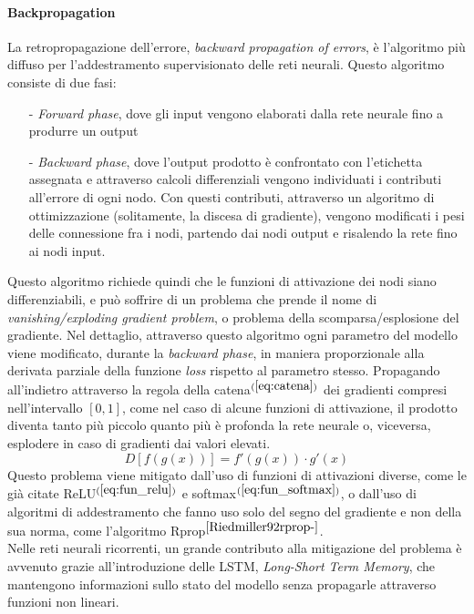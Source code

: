 \paragraph{Backpropagation} La retropropagazione dell'errore, \textit{backward propagation of errors}, è l'algoritmo più diffuso per l'addestramento supervisionato delle reti neurali. Questo algoritmo consiste di due fasi:
\begin{itemize}
    \item[-] \textit{Forward phase}, dove gli input vengono elaborati dalla rete neurale fino a produrre un output
    \item[-] \textit{Backward phase}, dove l'output prodotto è confrontato con l'etichetta assegnata e attraverso calcoli differenziali vengono individuati i contributi all'errore di ogni nodo. Con questi contributi, attraverso un algoritmo di ottimizzazione (solitamente, la discesa di gradiente), vengono modificati i pesi delle connessione fra i nodi, partendo dai nodi output e risalendo la rete fino ai nodi input.
\end{itemize}
Questo algoritmo richiede quindi che le funzioni di attivazione dei nodi siano differenziabili, e può soffrire di un problema che prende il nome di \textit{vanishing/exploding gradient problem}, o problema della scomparsa/esplosione del gradiente. Nel dettaglio, attraverso questo algoritmo ogni parametro del modello viene modificato, durante la \textit{backward phase}, in maniera proporzionale alla derivata parziale della funzione \textit{loss} rispetto al parametro stesso. Propagando all'indietro attraverso la regola della catena$^{(\ref{eq:catena})}$ dei gradienti compresi nell'intervallo $[0, 1]$, come nel caso di alcune funzioni di attivazione, il prodotto diventa tanto più piccolo quanto più è profonda la rete neurale o, viceversa, esplodere in caso di gradienti dai valori elevati.
\begin{equation}\label{eq:catena}
D\left[f(g(x))\right] = f'(g(x))\cdot g'(x)
\end{equation}
Questo problema viene mitigato dall'uso di funzioni di attivazioni diverse, come le già citate ReLU$^{(\ref{eq:fun_relu})}$ e softmax$^{(\ref{eq:fun_softmax})}$, o dall'uso di algoritmi di addestramento che fanno uso solo del segno del gradiente e non della sua norma, come l'algoritmo Rprop$^{\cite{Riedmiller92rprop-}}$.\\
Nelle reti neurali ricorrenti, un grande contributo alla mitigazione del problema è avvenuto grazie all'introduzione delle LSTM, \textit{Long-Short Term Memory}, che mantengono informazioni sullo stato del modello senza propagarle attraverso funzioni non lineari.

